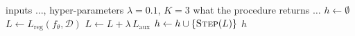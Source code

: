 \begin{algorithm}[t]
\caption{<one-line name of the procedure>}
\label{alg:<id>}
\begin{algorithmic}[1]
\Require inputs $\ldots$, hyper-parameters $\lambda = 0.1$, $K = 3$
\Ensure what the procedure returns $\ldots$
\State $h \gets \emptyset$
  \State $L \gets L_{\mathrm{reg}}(f_\theta, \mathcal{D})$
    \State $L \gets L + \lambda\, L_{\mathrm{aux}}$
  \EndIf
  \State $h \gets h \cup \{\textsc{Step}(L)\}$
\EndFor
\State \Return $h$
\end{algorithmic}
\end{algorithm}
